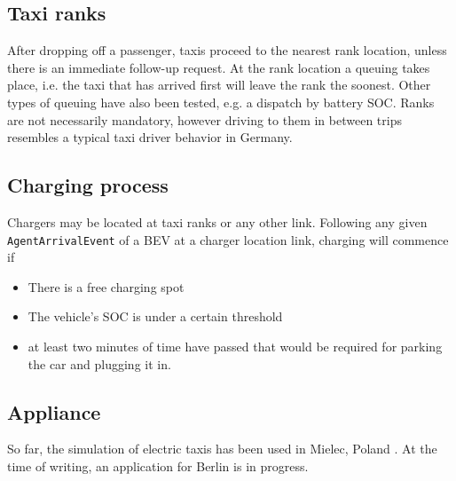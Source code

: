 \subsection{Taxi ranks}
After dropping off a passenger, taxis proceed to the nearest rank location, unless there is an immediate follow-up request. At the rank location a queuing takes place, i.e. the taxi that has arrived first will leave the rank the soonest. Other types of queuing have also been tested, e.g. a dispatch by battery SOC.
Ranks are not necessarily mandatory, however driving to them in between trips resembles a typical taxi driver behavior in Germany.
\subsection{Charging process}
Chargers may be located at taxi ranks or any other link. Following any given \lstinline$AgentArrivalEvent$ of a BEV at a charger location link, charging will commence if
\begin{itemize}
	\item There is a free charging spot
	\item The vehicle's SOC is under a certain threshold
	\item at least two minutes of time have passed that would be required for parking the car and plugging it in.
\end{itemize}
\subsection{Appliance}
So far, the simulation of electric taxis has been used in Mielec, Poland \citep[][]{Bischoff2013MaTaxis, BischoffMaciejewskiEcabMielecMobilTUM}. At the time of writing, an application for Berlin is in progress.



